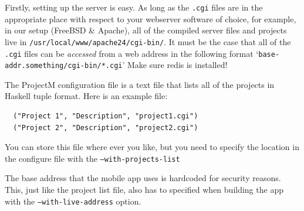 \documentclass{article}
\begin{document}
Firstly, setting up the server is easy. As long as the \texttt{.cgi} files are in the appropriate place with respect
to your webserver software of choice, for example, in our setup (FreeBSD \& Apache), all of the compiled server files and
projects live in \texttt{/usr/local/www/apache24/cgi-bin/}. It must be the case that all of the \texttt{.cgi} files can be
\textit{accessed} from a web address in the following format `\texttt{base-addr.something/cgi-bin/*.cgi}' Make sure redis is installed!

The ProjectM configuration file is a text file that lists all of the projects in Haskell tuple format.
Here is an example file:
\begin{verbatim}
  ("Project 1", "Description", "project1.cgi")
  ("Project 2", "Description", "project2.cgi")
\end{verbatim}
You can store this file where ever you like, but you need to specify the location in the configure file with the \texttt{--with-projects-list}

The base address that the mobile app uses is hardcoded for security reasons. This, just like the project list file, also has to specified when building
the app with the \texttt{--with-live-address} option.

\newpage
\end{document}
